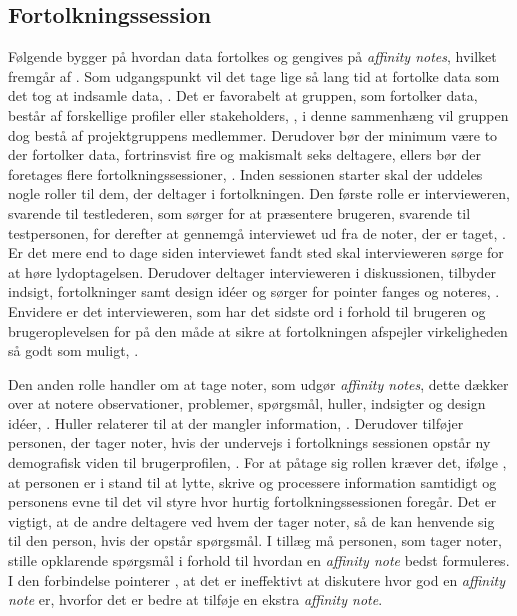 \subsection{Fortolkningssession}
\label{ParametreFortolkningssession}
%
Følgende bygger på hvordan data fortolkes og gengives på \textit{affinity notes}, hvilket fremgår af \textcite[ss. 101-122]{Book:CIInterpretationSession}. Som udgangspunkt vil det tage lige så lang tid at fortolke data som det tog at indsamle data, \parencite[s. 102]{Book:CIInterpretationSession}. Det er favorabelt at gruppen, som fortolker data, består af forskellige profiler eller stakeholders, \parencite[s. 104]{Book:CIInterpretationSession}, i denne sammenhæng vil gruppen dog bestå af projektgruppens medlemmer. Derudover bør der minimum være to der fortolker data, fortrinsvist fire og makismalt seks deltagere, ellers bør der foretages flere fortolkningssessioner, \parencite[s. 104]{Book:CIInterpretationSession}. \blankline
%
Inden sessionen starter skal der uddeles nogle roller til dem, der deltager i fortolkningen. Den første rolle er intervieweren, svarende til testlederen, som sørger for at præsentere brugeren, svarende til testpersonen, for derefter at gennemgå interviewet ud fra de noter, der er taget, \parencite[ss. 106-107]{Book:CIInterpretationSession}. Er det mere end to dage siden interviewet fandt sted skal intervieweren sørge for at høre lydoptagelsen. Derudover deltager intervieweren i diskussionen, tilbyder indsigt, fortolkninger samt design idéer og sørger for pointer fanges og noteres, \parencite[s. 107]{Book:CIInterpretationSession}. Envidere er det intervieweren, som har det sidste ord i forhold til brugeren og brugeroplevelsen for på den måde at sikre at fortolkningen afspejler virkeligheden så godt som muligt, \parencite[s. 107]{Book:CIInterpretationSession}.

Den anden rolle handler om at tage noter, som udgør \textit{affinity notes}, dette dækker over at notere observationer, problemer, spørgsmål, huller, indsigter og design idéer, \parencite[s. 107]{Book:CIInterpretationSession}. Huller relaterer til at der mangler information, \parencite[s. 162]{Book:BuildingAnAffinity}. Derudover tilføjer personen, der tager noter, hvis der undervejs i fortolknings sessionen opstår ny demografisk viden til brugerprofilen, \parencite[s. 107]{Book:CIInterpretationSession}. For at påtage sig rollen kræver det, ifølge \textcite[s. 107]{Book:CIInterpretationSession}, at personen er i stand til at lytte, skrive og processere information samtidigt og personens evne til det vil styre hvor hurtig fortolkningssessionen foregår. Det er vigtigt, at de andre deltagere ved hvem der tager noter, så de kan henvende sig til den person, hvis der opstår spørgsmål. I tillæg må personen, som tager noter, stille opklarende spørgsmål i forhold til hvordan en \textit{affinity note} bedst formuleres. I den forbindelse pointerer \textcite[s. 108]{Book:CIInterpretationSession}, at det er ineffektivt at diskutere hvor god en \textit{affinity note} er, hvorfor det er bedre at tilføje en ekstra \textit{affinity note}. 

